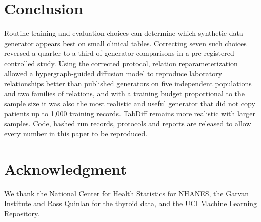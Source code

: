 \documentclass[conference]{IEEEtran}
\begin{document}
\section{Conclusion}

Routine training and evaluation choices can determine which synthetic data generator appears best on small clinical tables. Correcting seven such choices reversed a quarter to a third of generator comparisons in a pre-registered controlled study. Using the corrected protocol, relation reparameterization allowed a hypergraph-guided diffusion model to reproduce laboratory relationships better than published generators on five independent populations and two families of relations, and with a training budget proportional to the sample size it was also the most realistic and useful generator that did not copy patients up to 1,000 training records. TabDiff remains more realistic with larger samples. Code, hashed run records, protocols and reports are released to allow every number in this paper to be reproduced.

\section*{Acknowledgment}

We thank the National Center for Health Statistics for NHANES, the Garvan Institute and Ross Quinlan for the thyroid data, and the UCI Machine Learning Repository.
\end{document}
